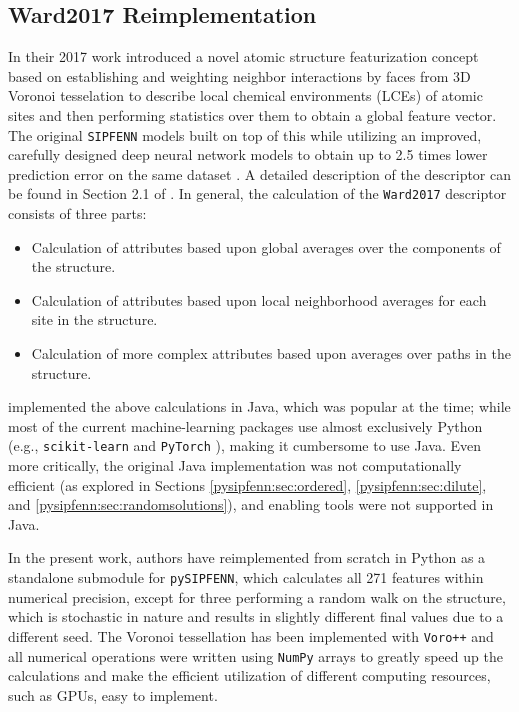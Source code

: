 \subsection{Ward2017 Reimplementation} \label{pysipfenn:ssec:Ward2017Translation}

In their 2017 work \citet{Ward2017} introduced a novel atomic structure featurization concept based on establishing and weighting neighbor interactions by faces from 3D Voronoi tesselation to describe local chemical environments (LCEs) of atomic sites and then performing statistics over them to obtain a global feature vector. The original \texttt{SIPFENN} models \cite{Krajewski2020SIPFENNModels} built on top of this while utilizing an improved, carefully designed deep neural network models to obtain up to 2.5 times lower prediction error on the same dataset \cite{Krajewski2022ExtensibleNetworks}. A detailed description of the descriptor can be found in Section 2.1 of \citet{Krajewski2022ExtensibleNetworks}. In general, the calculation of the \texttt{Ward2017} descriptor consists of three parts:

\begin{itemize}
    \item Calculation of attributes based upon global averages over the components of the structure.
    \item Calculation of attributes based upon local neighborhood averages for each site in the structure.
    \item Calculation of more complex attributes based upon averages over paths in the structure.
\end{itemize}

\citet{Ward2017} implemented the above calculations in Java, which was popular at the time; while most of the current machine-learning packages use almost exclusively Python (e.g., \texttt{scikit-learn} \cite{PedregosaFABIANPEDREGOSA2011Scikit-learn:Python} and \texttt{PyTorch} \cite{Paszke2019PyTorch:Library}), making it cumbersome to use Java. Even more critically, the original Java implementation was not computationally efficient (as explored in Sections \ref{pysipfenn:sec:ordered}, \ref{pysipfenn:sec:dilute}, and \ref{pysipfenn:sec:randomsolutions}), and enabling tools were not supported in Java.

In the present work, authors have reimplemented \citet{Ward2017} from scratch in Python as a standalone submodule for \texttt{pySIPFENN}, which calculates all 271 features within numerical precision, except for three performing a random walk on the structure, which is stochastic in nature and results in slightly different final values due to a different seed. The Voronoi tessellation has been implemented with \texttt{Voro++} \cite{Rycroft2007MultiscaleFlow, Rycroft2009Voro++:C++, Lu2023AnCells} and all numerical operations were written using \texttt{NumPy} \cite{Harris2020ArrayNumPy} arrays to greatly speed up the calculations and make the efficient utilization of different computing resources, such as GPUs, easy to implement.


